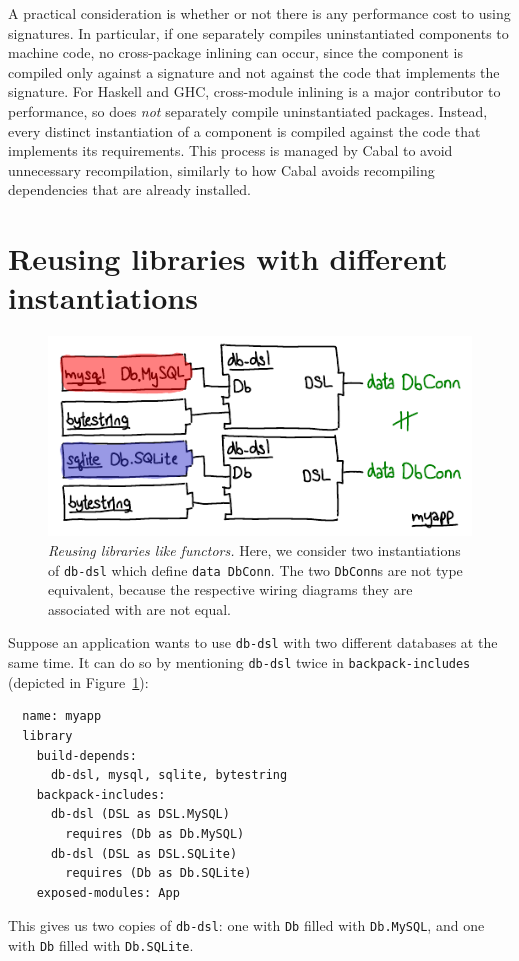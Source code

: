 A practical consideration is whether or not there is any performance
cost to using signatures.  In particular, if one separately compiles
uninstantiated components to machine code, no cross-package inlining
can occur, since the component is compiled only against a signature
and not against the code that implements the signature.
For Haskell and GHC, cross-module inlining is a major contributor to performance,
so \Backpack{} does \emph{not}
separately compile uninstantiated packages. Instead, every distinct
instantiation of a component is compiled against the code that implements
its requirements. This process is managed by
Cabal to avoid unnecessary recompilation, similarly to how Cabal
avoids recompiling dependencies that are already installed.

\section{Reusing libraries with different instantiations}

\begin{figure}
\includegraphics{diagrams/reusing-packages-functors.pdf}
\caption{\emph{Reusing libraries like functors.}  Here, we consider
two instantiations of \texttt{db-dsl} which define \texttt{data DbConn}.
The two \texttt{DbConn}s are not type equivalent, because the respective
wiring diagrams they are associated with are not equal.}
\label{fig:reusing-packages-functors}
\end{figure}

Suppose an application wants to use \verb|db-dsl| with two different databases
at the same time. It can do so by mentioning \verb|db-dsl| twice in
\verb|backpack-includes| (depicted in Figure~\ref{fig:reusing-packages-functors}):

\begin{verbatim}
  name: myapp
  library
    build-depends:
      db-dsl, mysql, sqlite, bytestring
    backpack-includes:
      db-dsl (DSL as DSL.MySQL)
        requires (Db as Db.MySQL)
      db-dsl (DSL as DSL.SQLite)
        requires (Db as Db.SQLite)
    exposed-modules: App
\end{verbatim}
%
This gives us two copies of \verb|db-dsl|: one with \verb|Db| filled
with \verb|Db.MySQL|, and one with \verb|Db| filled with
\verb|Db.SQLite|.

